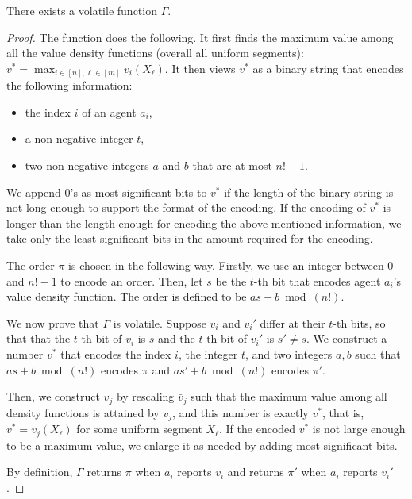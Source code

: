 \begin{propositionrep}
    There exists a volatile function $\Gamma$.
\end{propositionrep}
\begin{proof}
    The function does the following.
    It first finds the maximum value among all the value density functions (overall all uniform segments): $v^\ast=\max_{i\in[n],\ell\in[m]}v_i(X_\ell)$.
    It then views $v^\ast$ as a binary string that encodes the following information:
    \begin{itemize}
        \item the index $i$ of an agent $a_i$,
        \item a non-negative integer $t$,
        \item two non-negative integers $a$ and $b$ that are at most $n!-1$.
    \end{itemize}
    We append $0$'s as most significant bits to $v^\ast$ if the length of the binary string is not long enough to support the format of the encoding.
    If the encoding of $v^\ast$ is longer than the length enough for encoding the above-mentioned information, we take only the least significant bits in the amount required for the encoding.

    The order $\pi$ is chosen in the following way.
    Firstly, we use an integer between $0$ and $n!-1$ to encode an order.
    Then, let $s$ be the $t$-th bit that encodes agent $a_i$'s value density function.
    The order is defined to be $as+b\bmod (n!)$.

We now prove that $\Gamma$ is volatile.
Suppose $v_i$ and $v_i'$ differ at their $t$-th bits, 
so that that the $t$-th bit of $v_i$ is $s$ and the $t$-th bit of $v_i'$ is $s'\neq s$.
We construct a number $v^*$ that encodes the index $i$, the integer $t$, and two integers $a,b$ 
such that $as+b\bmod (n!)$ encodes $\pi$ and $as'+b\bmod (n!)$ encodes $\pi'$.


Then, we construct $v_j$ by rescaling $\bar{v}_j$ such that the maximum value among all density functions is attained by $v_j$, and this number is exactly $v^{\ast}$, that is, $v^\ast=v_j(X_\ell)$ for some uniform segment $X_\ell$.
If the encoded $v^*$ is not large enough to be a maximum value, we enlarge it as needed by adding most significant bits.

By definition, $\Gamma$ returns $\pi$ when $a_i$ reports $v_i$ and returns $\pi'$ when $a_i$ reports $v_i'$.

\end{proof}

